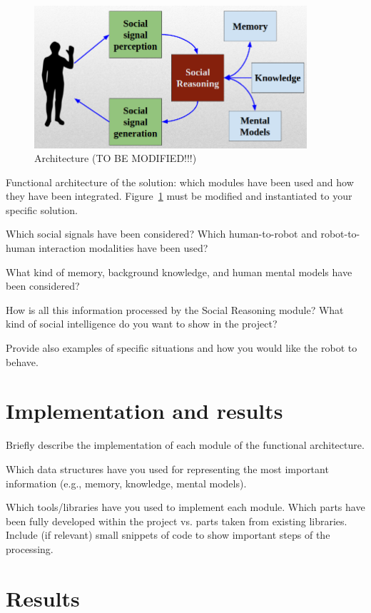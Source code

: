 \documentclass{article}
\begin{document}
\begin{figure}
    \centering
\includegraphics[width=0.9\textwidth]{HRI_arch.png}
    \caption{Architecture (TO BE MODIFIED!!!)}
    \label{fig:arch}
\end{figure}

Functional architecture of the solution: which modules have been used and how they have been integrated.
Figure~\ref{fig:arch} must be modified and instantiated to your specific solution.


Which social signals have been considered? Which human-to-robot and robot-to-human interaction modalities have been used?

What kind of memory, background knowledge, and human mental models have been considered?

How is all this information processed by the Social Reasoning module? What kind of social intelligence do you want to show in the project?

Provide also examples of specific situations and how you would like the robot to behave.

\section{Implementation and results}

Briefly describe the implementation of each module of the functional architecture.

Which data structures have you used for representing the most important information (e.g., memory, knowledge, mental models).

Which tools/libraries have you used to implement each module. 
Which parts have been fully developed within the project vs. parts taken from existing libraries. 
Include (if relevant) small snippets of code to show important steps of the processing.

\section{Results}
\end{document}
